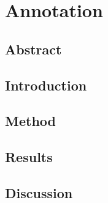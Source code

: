 \section{Annotation}

    \subsection{Abstract}

        \noindent

    \subsection{Introduction}

        \noindent

    \subsection{Method}

        \noindent

    \subsection{Results}

        \noindent

    \subsection{Discussion}

        \noindent

